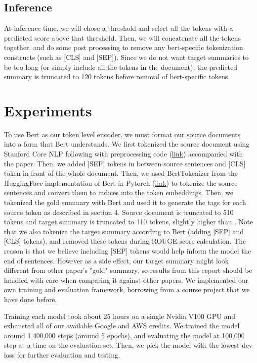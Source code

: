 \documentclass[11pt,a4paper]{article}
\begin{document}
\subsection{Inference}
At inference time, we will chose a threshold and select all the tokens with a predicted score above that threshold. Then, we will concatenate all the tokens together, and do some post processing to remove any bert-specific tokenization constructs (such as [CLS] and [SEP]). Since we do not want target summaries to be too long (or simply include all the tokens in the document), the predicted summary is truncated to 120 tokens before removal of bert-specific tokens.



\section{Experiments}
To use Bert as our token level encoder, we must format our source documents into a form that Bert understands. We first tokenized the source document using Stanford Core NLP following \citet{pointer-generator} with preprocessing code (\href{https://github.com/abisee/cnn-dailymail}{link}) accompanied with the paper. Then, we added [SEP] tokens in between source sentences and [CLS] token in front of the whole document. Then, we used BertTokenizer from the HuggingFace implementation of Bert in Pytorch (\href{https://github.com/huggingface/pytorch-pretrained-BERT}{link}) to tokenize the source sentences and convert them to indices into the token embeddings. Then, we tokenized the gold summary with Bert and used it to generate the tags for each source token as described in section 4. Source document is truncated to 510 tokens and target summary is truncated to 110 tokens, slightly higher than \citet{bert-sum}. Note that we also tokenize the target summary according to Bert (adding [SEP] and [CLS] tokens), and removed these tokens during ROUGE score calculation. The reason is that we believe including [SEP] tokens would help inform the model the end of sentences. However as a side effect, our target summary might look different from other paper's "gold" summary, so results from this report should be handled with care when comparing it against other papers. We implemented our own training and evaluation framework, borrowing from a course project that we have done before. 

Training each model took about 25 hours on a single Nvidia V100 GPU and exhausted all of our available Google and AWS credits. We trained the model around 1,400,000 steps (around 5 epochs), and evaluating the model at 100,000 step at a time on the evaluation set. Then, we pick the model with the lowest dev loss for further evaluation and testing.
\end{document}

